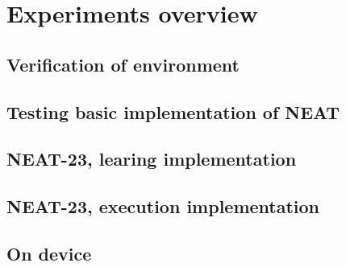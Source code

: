 \FloatBarrier
\chapter{Experiments overview}

\FloatBarrier
\section{Verification of environment}

\FloatBarrier
\section{Testing basic implementation of NEAT}

\FloatBarrier
\section{NEAT-23, learing implementation}

\FloatBarrier
\section{NEAT-23, execution implementation}

\FloatBarrier
\section{On device}
